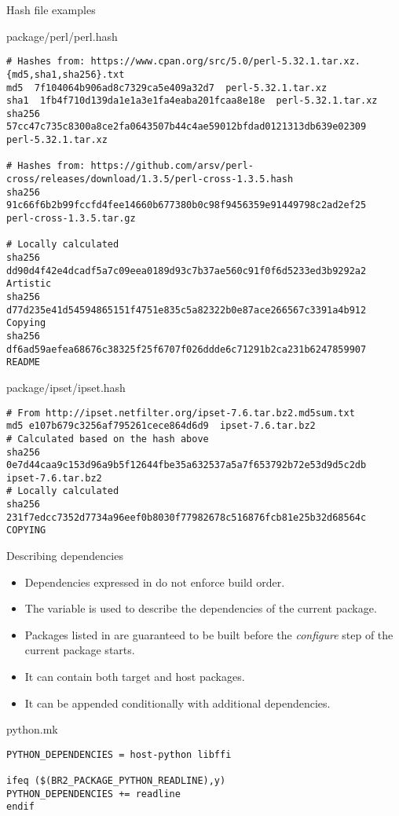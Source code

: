 \begin{frame}[fragile]{Hash file examples}
  \begin{block}{package/perl/perl.hash}
    {\tiny
\begin{verbatim}
# Hashes from: https://www.cpan.org/src/5.0/perl-5.32.1.tar.xz.{md5,sha1,sha256}.txt
md5  7f104064b906ad8c7329ca5e409a32d7  perl-5.32.1.tar.xz
sha1  1fb4f710d139da1e1a3e1fa4eaba201fcaa8e18e  perl-5.32.1.tar.xz
sha256  57cc47c735c8300a8ce2fa0643507b44c4ae59012bfdad0121313db639e02309  perl-5.32.1.tar.xz

# Hashes from: https://github.com/arsv/perl-cross/releases/download/1.3.5/perl-cross-1.3.5.hash
sha256  91c66f6b2b99fccfd4fee14660b677380b0c98f9456359e91449798c2ad2ef25  perl-cross-1.3.5.tar.gz

# Locally calculated
sha256  dd90d4f42e4dcadf5a7c09eea0189d93c7b37ae560c91f0f6d5233ed3b9292a2  Artistic
sha256  d77d235e41d54594865151f4751e835c5a82322b0e87ace266567c3391a4b912  Copying
sha256  df6ad59aefea68676c38325f25f6707f026ddde6c71291b2ca231b6247859907  README
\end{verbatim}
    }
  \end{block}

  \begin{block}{package/ipset/ipset.hash}
    {\tiny
\begin{verbatim}
# From http://ipset.netfilter.org/ipset-7.6.tar.bz2.md5sum.txt
md5 e107b679c3256af795261cece864d6d9  ipset-7.6.tar.bz2
# Calculated based on the hash above
sha256 0e7d44caa9c153d96a9b5f12644fbe35a632537a5a7f653792b72e53d9d5c2db  ipset-7.6.tar.bz2
# Locally calculated
sha256 231f7edcc7352d7734a96eef0b8030f77982678c516876fcb81e25b32d68564c  COPYING
\end{verbatim}
    }
  \end{block}
\end{frame}

\begin{frame}[fragile]{Describing dependencies}
  \begin{itemize}
  \item Dependencies expressed in  do not enforce
    build order.
  \item The  variable is used to describe the
    dependencies of the current package.
  \item Packages listed in  are guaranteed to
    be built before the {\em configure} step of the current package
    starts.
  \item It can contain both target and host packages.
  \item It can be appended conditionally with additional dependencies.
  \end{itemize}

  \begin{block}{python.mk}
    \begin{verbatim}
PYTHON_DEPENDENCIES = host-python libffi

ifeq ($(BR2_PACKAGE_PYTHON_READLINE),y)
PYTHON_DEPENDENCIES += readline
endif
    \end{verbatim}
  \end{block}
\end{frame}

